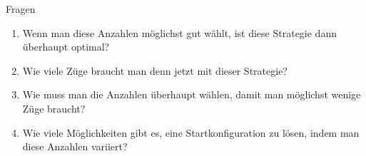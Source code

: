 \begin{frame}{Fragen}
    \begin{enumerate}
    \item Wenn man diese Anzahlen möglichst gut wählt, ist diese Strategie dann überhaupt optimal?
    \item Wie viele Züge braucht man denn jetzt mit dieser Strategie?
    \item Wie muss man die Anzahlen überhaupt wählen, damit man möglichst wenige Züge braucht?
    \item Wie viele Möglichkeiten gibt es, eine Startkonfiguration zu lösen, indem man diese Anzahlen variiert?
    \end{enumerate}
\end{frame}